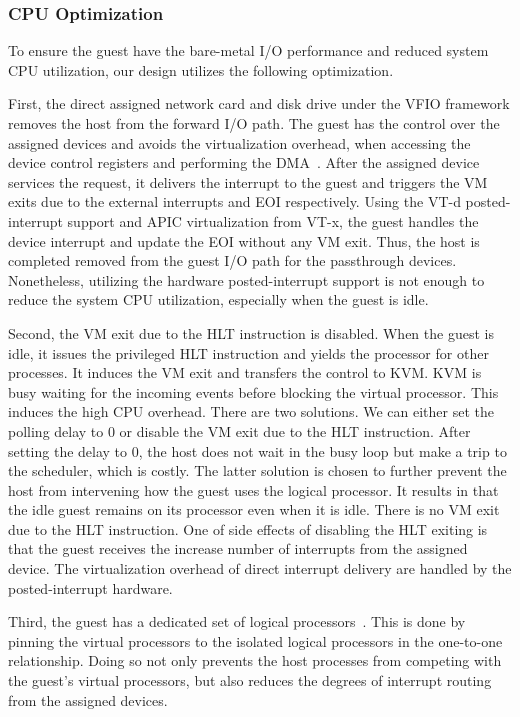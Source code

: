 \subsubsection{CPU Optimization}
To ensure the guest have the bare-metal I/O performance and
reduced system CPU utilization, our design utilizes the
following optimization.

First, the direct assigned network card and disk drive under
the VFIO framework removes the host from the forward I/O path.
The guest has the control over the assigned devices and avoids
the virtualization overhead, when accessing the device control
registers and performing the
DMA~\cite{sdm:2018,vt-d:2017,williamson:2016}. After the
assigned device services the request, it delivers the
interrupt to the guest and triggers the VM exits due to the
external interrupts and EOI respectively. Using the VT-d
posted-interrupt support and APIC virtualization from VT-x,
the guest handles the device interrupt and update the EOI
without any VM exit. Thus, the host is completed removed from
the guest I/O path for the passthrough devices. Nonetheless,
utilizing the hardware posted-interrupt support is not enough
to reduce the system CPU utilization, especially when the
guest is idle.

Second, the VM exit due to the HLT instruction is disabled.
When the guest is idle, it issues the privileged HLT
instruction and yields the processor for other processes. It
induces the VM exit and transfers the control to KVM. KVM is
busy waiting for the incoming events before blocking the
virtual processor. This induces the high CPU overhead. There
are two solutions. We can either set the polling delay to 0 or
disable the VM exit due to the HLT instruction. After setting
the delay to 0, the host does not wait in the busy loop but
make a trip to the scheduler, which is costly. The latter
solution is chosen to further prevent the host from
intervening how the guest uses the logical processor. It
results in that the idle guest remains on its processor even
when it is idle. There is no VM exit due to the HLT
instruction. One of side effects of disabling the HLT exiting
is that the guest receives the increase number of interrupts
from the assigned device. The virtualization overhead of
direct interrupt delivery are handled by the posted-interrupt
hardware.

Third, the guest has a dedicated set of logical
processors~\cite{amit:2015}. This is done by pinning the
virtual processors to the isolated logical processors in the
one-to-one relationship. Doing so not only prevents the host
processes from competing with the guest's virtual processors,
but also reduces the degrees of interrupt routing from the
assigned devices.

